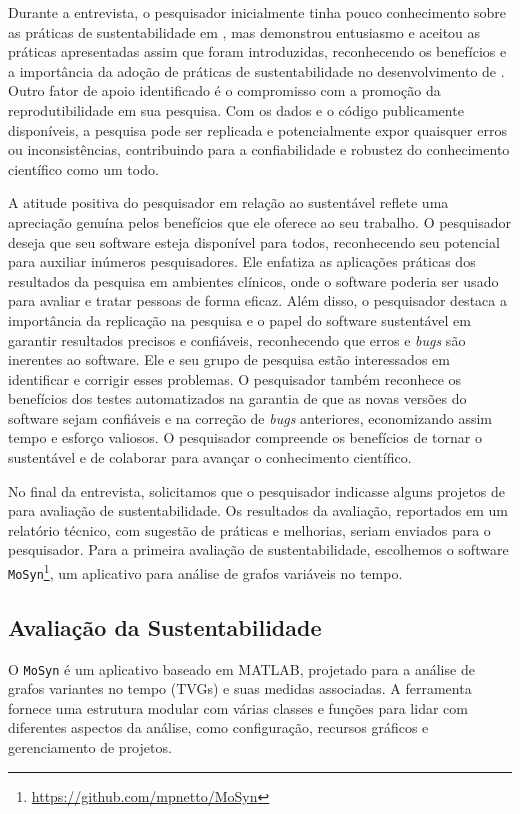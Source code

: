 Durante a entrevista, o pesquisador inicialmente tinha pouco conhecimento sobre as práticas de sustentabilidade em \RSw, mas demonstrou entusiasmo e aceitou as práticas apresentadas assim que foram introduzidas,  reconhecendo os benefícios e a importância da adoção de práticas de sustentabilidade no desenvolvimento de \RS. 
Outro fator de apoio identificado é o compromisso com a promoção da reprodutibilidade em sua pesquisa. 
Com os dados e o código publicamente disponíveis, a pesquisa pode ser replicada e potencialmente expor quaisquer erros ou inconsistências, contribuindo para a confiabilidade e robustez do conhecimento científico como um todo.

A atitude positiva do pesquisador em relação ao \RSw sustentável reflete uma apreciação genuína pelos benefícios que ele oferece ao seu trabalho. O pesquisador deseja que seu software esteja disponível para todos, reconhecendo seu potencial para auxiliar inúmeros pesquisadores. Ele enfatiza as aplicações práticas dos resultados da pesquisa em ambientes clínicos, onde o software poderia ser usado para avaliar e tratar pessoas de forma eficaz.
Além disso, o pesquisador destaca a importância da replicação na pesquisa e o papel do software sustentável em garantir resultados precisos e confiáveis, reconhecendo que erros e \textit{bugs} são inerentes ao software. Ele e seu grupo de pesquisa estão interessados em identificar e corrigir esses problemas. O pesquisador também reconhece os benefícios dos testes automatizados na garantia de que as novas versões do software sejam confiáveis e na correção de \textit{bugs} anteriores, economizando assim tempo e esforço valiosos. O pesquisador compreende os benefícios de tornar o \RSw sustentável e de colaborar para avançar o conhecimento científico.

No final da entrevista, solicitamos que o pesquisador indicasse alguns projetos de \RSw para avaliação de  sustentabilidade. Os resultados da avaliação, reportados em um relatório técnico, com sugestão de práticas e  melhorias,
seriam enviados para o pesquisador. 
%
Para a primeira avaliação de sustentabilidade, escolhemos o software \texttt{MoSyn}\footnote{\url{https://github.com/mpnetto/MoSyn}}, um aplicativo para análise de grafos variáveis no tempo.

\subsection{Avaliação da Sustentabilidade}

O \RSw \texttt{MoSyn} é um aplicativo baseado em MATLAB, projetado para a análise de grafos variantes no tempo (TVGs) e suas medidas associadas. A ferramenta fornece uma estrutura modular com várias classes e funções para lidar com diferentes aspectos da análise, como configuração, recursos gráficos e gerenciamento de projetos.

